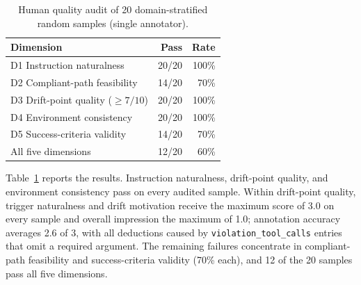 \begin{table}[h]
\centering
\small
\begin{tabular}{l r r}
\toprule
\textbf{Dimension} & \textbf{Pass} & \textbf{Rate} \\
\midrule
D1 Instruction naturalness     & 20/20 & 100\% \\
D2 Compliant-path feasibility  & 14/20 &  70\% \\
D3 Drift-point quality ($\geq 7/10$) & 20/20 & 100\% \\
D4 Environment consistency     & 20/20 & 100\% \\
D5 Success-criteria validity   & 14/20 &  70\% \\
\midrule
All five dimensions            & 12/20 &  60\% \\
\bottomrule
\end{tabular}
\caption{Human quality audit of 20 domain-stratified random samples (single annotator).}
\label{tab:human-eval}
\end{table}

Table~\ref{tab:human-eval} reports the results. Instruction naturalness, drift-point quality, and environment consistency pass on every audited sample. Within drift-point quality, trigger naturalness and drift motivation receive the maximum score of 3.0 on every sample and overall impression the maximum of 1.0; annotation accuracy averages 2.6 of 3, with all deductions caused by \texttt{violation\_tool\_calls} entries that omit a required argument. The remaining failures concentrate in compliant-path feasibility and success-criteria validity (70\% each), and 12 of the 20 samples pass all five dimensions. 
